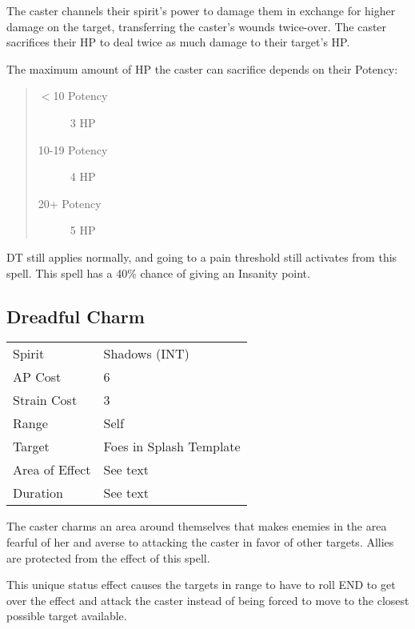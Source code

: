 \documentclass[11pt,a4paper,twocolumn]{book}
\begin{document}
\medskip

The caster channels their spirit's power to damage them in exchange for higher damage on the target, transferring the caster's wounds twice-over. The caster sacrifices their HP to deal twice as much damage to their target's HP.

The maximum amount of HP the caster can sacrifice depends on their Potency:
\begin{quote}
	\begin{description}
		\item[$<$10 Potency] 	3 HP
		\item[10-19 Potency] 	4 HP
		\item[20+ Potency] 	5 HP
	\end{description}
\end{quote}

DT still applies normally, and going to a pain threshold still activates from this spell. This spell has a 40\% chance of giving an Insanity point.

\subsection*{Dreadful Charm}
{
	\begin{tabu} to 75mm{| X[l,4] | X[l,7] |}
		\hline
		Spirit 			&  Shadows (INT)\\
		AP Cost	      	&  6				\\
		Strain Cost     &  3			\\
		Range     		&  Self	\\
		Target      	&  Foes in Splash Template			\\
		Area of Effect  &  See text	 			\\
		Duration     	&  See text			\\ \hline
	\end{tabu}
	
}

\medskip

The caster charms an area around themselves that makes enemies in the area fearful of her and averse to attacking the caster in favor of other targets. Allies are protected from the effect of this spell.

This unique status effect causes the targets in range to have to roll END to get over the effect and attack the caster instead of being forced to move to the closest possible target available. 
\end{document}
